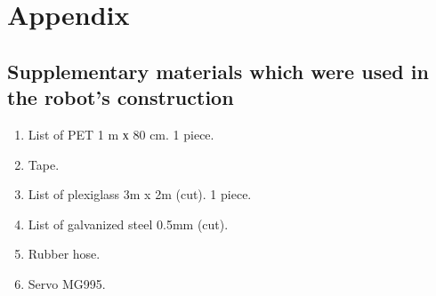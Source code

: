 \section{Appendix}
\subsection{Supplementary materials which were used in the robot's construction}

\begin{enumerate}
	\item List of PET 1 m х 80 cm. 1 piece.
	\item Tape.
	\item List of plexiglass 3m x 2m (cut). 1 piece.
	\item List of galvanized steel 0.5mm (cut).
	\item Rubber hose.
	\item Servo MG995.
\end{enumerate}
\fillpage



